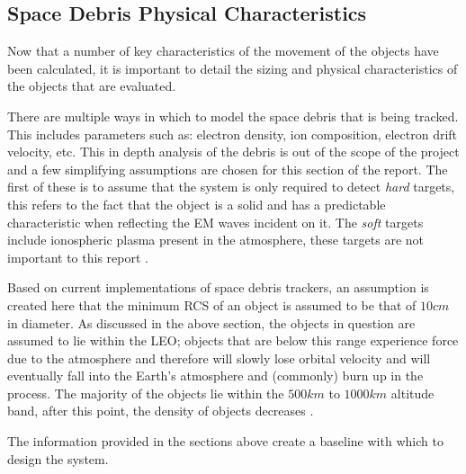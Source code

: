 \documentclass[11pt]{witseiepaper}
\begin{document}
\begin{bibunit}[witseie]
\subsection{Space Debris Physical Characteristics} \label{sec:SpaceDebrisPhysicalCharacteristics}
Now that a number of key characteristics of the movement of the objects have been calculated, it is important to detail the sizing and physical characteristics of the objects that are evaluated.

There are multiple ways in which to model the space debris that is being tracked. This includes parameters such as: electron density, ion composition, electron drift velocity, etc. This in depth analysis of the debris is out of the scope of the project and a few simplifying assumptions are chosen for this section of the report.
The first of these is to assume that the system is only required to detect \textit{hard} targets, this refers to the fact that the object is a solid and has a predictable characteristic when reflecting the EM waves incident on it. The \textit{soft} targets include ionospheric plasma present in the atmosphere, these targets are not important to this report \cite{softTarget}.  

Based on current implementations of space debris trackers, an assumption is created here that the minimum RCS of an object is assumed to be that of $10 cm$ in diameter.
As discussed in the above section, the objects in question are assumed to lie within the LEO; objects that are below this range experience force due to the atmosphere and therefore will slowly lose orbital velocity and will eventually fall into the Earth's atmosphere and (commonly) burn up in the process.
The majority of the objects lie within the $500 km$ to $1000 km$ altitude band, after this point, the density of objects decreases \cite{ObjectInformation}.

The information provided in the sections above create a baseline with which to design the system.





\end{bibunit}
\end{document}
